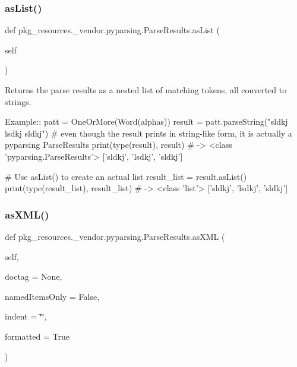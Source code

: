 \subsubsection{\texorpdfstring{as\+List()}{asList()}}
{\footnotesize\ttfamily def pkg\+\_\+resources.\+\_\+vendor.\+pyparsing.\+Parse\+Results.\+as\+List (\begin{DoxyParamCaption}\item[{}]{self }\end{DoxyParamCaption})}

\begin{DoxyVerb}Returns the parse results as a nested list of matching tokens, all converted to strings.

Example::
    patt = OneOrMore(Word(alphas))
    result = patt.parseString("sldkj lsdkj sldkj")
    # even though the result prints in string-like form, it is actually a pyparsing ParseResults
    print(type(result), result) # -> <class 'pyparsing.ParseResults'> ['sldkj', 'lsdkj', 'sldkj']
    
    # Use asList() to create an actual list
    result_list = result.asList()
    print(type(result_list), result_list) # -> <class 'list'> ['sldkj', 'lsdkj', 'sldkj']
\end{DoxyVerb}
 \mbox{\label{classpkg__resources_1_1__vendor_1_1pyparsing_1_1_parse_results_a5a6a33bef33c1cd43437358783fdffde}} 
\subsubsection{\texorpdfstring{as\+X\+M\+L()}{asXML()}}
{\footnotesize\ttfamily def pkg\+\_\+resources.\+\_\+vendor.\+pyparsing.\+Parse\+Results.\+as\+X\+ML (\begin{DoxyParamCaption}\item[{}]{self,  }\item[{}]{doctag = {\ttfamily None},  }\item[{}]{named\+Items\+Only = {\ttfamily False},  }\item[{}]{indent = {\ttfamily \char`\"{}\char`\"{}},  }\item[{}]{formatted = {\ttfamily True} }\end{DoxyParamCaption})}

